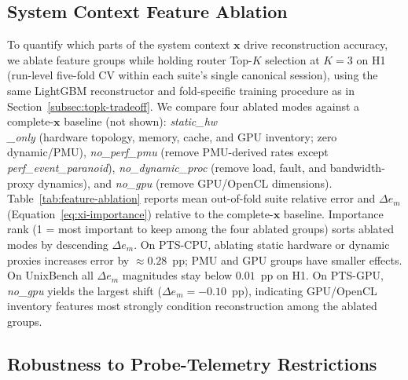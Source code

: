 \documentclass[sigplan,10pt]{acmart}
\newcommand{\ptscpu}{PTS-CPU}
\newcommand{\ptsgpu}{PTS-GPU}
\newcommand{\id}[1]{{\itshape #1}}
\begin{document}
\subsection{System Context Feature Ablation}
\label{subsec:feature-ablation}
To quantify which parts of the system context \(\mathbf{x}\) drive reconstruction accuracy, we ablate feature groups while holding router Top-$K$ selection at $K{=}3$ on H1 (run-level five-fold CV within each suite's single canonical session), using the same LightGBM reconstructor and fold-specific training procedure as in Section~\ref{subsec:topk-tradeoff}.
We compare four ablated modes against a complete-\(\mathbf{x}\) baseline (not shown):
\id{static\_hw\\\_only} (hardware topology, memory, cache, and GPU inventory; zero dynamic/PMU),
\id{no\_perf\_pmu} (remove PMU-derived rates except \id{perf\_event\_paranoid}),
\id{no\_dynamic\_proc} (remove load, fault, and bandwidth-proxy dynamics),
and \id{no\_gpu} (remove GPU/OpenCL dimensions).
Table~\ref{tab:feature-ablation} reports mean out-of-fold suite relative error and $\Delta e_m$ (Equation~\ref{eq:xi-importance}) relative to the complete-\(\mathbf{x}\) baseline.
Importance rank (1 = most important to keep among the four ablated groups) sorts ablated modes by descending $\Delta e_m$.
On \ptscpu, ablating static hardware or dynamic  proxies increases error by ${\approx}0.28$~pp; PMU and GPU groups have smaller effects.
On UnixBench all $\Delta e_m$ magnitudes stay below $0.01$~pp on H1.
On \ptsgpu, \id{no\_gpu} yields the largest shift ($\Delta e_m = -0.10$~pp), indicating GPU/OpenCL inventory features most strongly condition reconstruction among the ablated groups.


\subsection{Robustness to Probe-Telemetry Restrictions}
\label{subsec:probe-ebpf-ablation}
\end{document}
